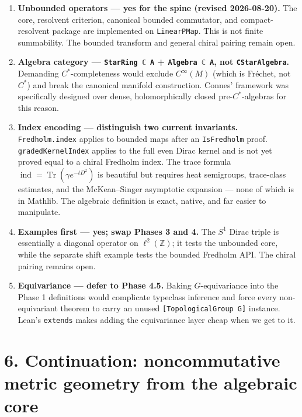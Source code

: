 \documentclass[
  11pt,
]{article}
\newcounter{none} %
\providecommand{\tightlist}{%
  \setlength{\itemsep}{0pt}\setlength{\parskip}{0pt}}
\begin{document}
\begin{enumerate}
\def\labelenumi{\arabic{enumi}.}
\tightlist
\item
  \textbf{Unbounded operators --- yes for the spine (revised
  2026-08-20).} The core, resolvent criterion, canonical bounded
  commutator, and compact-resolvent package are implemented on
  \texttt{LinearPMap}. This is not finite summability. The bounded
  transform and general chiral pairing remain open.
\item
  \textbf{Algebra category --- \texttt{StarRing\ ℂ\ A} +
  \texttt{Algebra\ ℂ\ A}, not \texttt{CStarAlgebra}.} Demanding
  \(C^*\)-completeness would exclude \(C^\infty(M)\) (which is Fréchet,
  not \(C^*\)) and break the canonical manifold construction. Connes'
  framework was specifically designed over dense, holomorphically closed
  pre-\(C^*\)-algebras for this reason.
\item
  \textbf{Index encoding --- distinguish two current invariants.}
  \texttt{Fredholm.index} applies to bounded maps after an
  \texttt{IsFredholm} proof. \texttt{gradedKernelIndex} applies to the
  full even Dirac kernel and is not yet proved equal to a chiral
  Fredholm index. The trace formula
  \(\mathop{\mathrm{ind}}= \mathop{\mathrm{Tr}}(\gamma e^{-tD^2})\) is
  beautiful but requires heat semigroups, trace-class estimates, and the
  McKean--Singer asymptotic expansion --- none of which is in Mathlib.
  The algebraic definition is exact, native, and far easier to
  manipulate.
\item
  \textbf{Examples first --- yes; swap Phases 3 and 4.} The \(S^1\)
  Dirac triple is essentially a diagonal operator on
  \(\ell^2(\mathbb{Z})\); it tests the unbounded core, while the separate
  shift example tests the bounded Fredholm API. The chiral pairing
  remains open.
\item
  \textbf{Equivariance --- defer to Phase 4.5.} Baking
  \(G\)-equivariance into the Phase 1 definitions would complicate
  typeclass inference and force every non-equivariant theorem to carry
  an unused \texttt{{[}TopologicalGroup\ G{]}} instance. Lean's
  \texttt{extends} makes adding the equivariance layer cheap when we get
  to it.
\end{enumerate}

\section{6. Continuation: noncommutative metric geometry from the
algebraic
core}\label{continuation-noncommutative-metric-geometry-from-the-algebraic-core}
\end{document}
